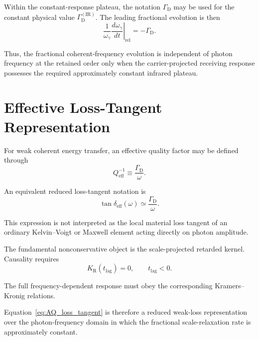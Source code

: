 Within the constant-response plateau, the notation
\(\Gamma_{\mathrm D}\) may be used for the constant physical value
\(\Gamma_{\mathrm D}^{(\mathrm{IR})}\). The leading fractional evolution is
then
\begin{equation}
    \boxed{
    \frac{1}{\omega_{\gamma}}
    \left.
    \frac{
        d\omega_{\gamma}
    }{
        dt
    }
    \right|_{\mathrm{rel}}
    =
    -\Gamma_{\mathrm D}.
    }
    \label{eq:AQ_fractional_achromaticity}
\end{equation}

Thus, the fractional coherent-frequency evolution is independent of photon
frequency at the retained order only when the carrier-projected receiving
response possesses the required approximately constant infrared plateau.

\section{Effective Loss-Tangent Representation}

For weak coherent energy transfer, an effective quality factor may be defined
through
\begin{equation}
    Q_{\mathrm{eff}}^{-1}
    \equiv
    \frac{
        \Gamma_{\mathrm D}
    }{
        \omega
    }.
\end{equation}

An equivalent reduced loss-tangent notation is
\begin{equation}
    \boxed{
    \tan\delta_{\mathrm{eff}}(\omega)
    \simeq
    \frac{
        \Gamma_{\mathrm D}
    }{
        \omega
    }.
    }
    \label{eq:AQ_loss_tangent}
\end{equation}

This expression is not interpreted as the local material loss tangent of an
ordinary Kelvin--Voigt or Maxwell element acting directly on photon amplitude.

The fundamental nonconservative object is the scale-projected retarded kernel.
Causality requires
\begin{equation}
    K_{\mathrm R}(t_{\mathrm{lag}})
    =
    0,
    \qquad
    t_{\mathrm{lag}}<0.
\end{equation}

The full frequency-dependent response must obey the corresponding
Kramers--Kronig relations.

Equation~\eqref{eq:AQ_loss_tangent} is therefore a reduced weak-loss
representation over the photon-frequency domain in which the fractional
scale-relaxation rate is approximately constant.


